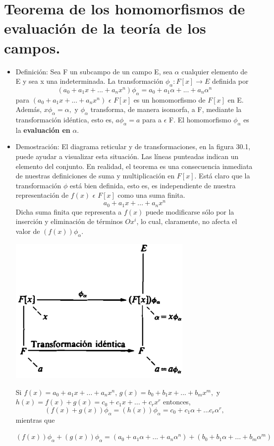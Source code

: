\documentclass[a4paper,12pt]{article}
\begin{document}
\tableofcontents

\section{Teorema de los homomorfismos de evaluación de la teoría de los campos.}


\begin{itemize}

    \item Definición:
     Sea F un subcampo de un campo E, sea $\alpha$ cualquier elemento de E y sea x una indeterminada. La transformación $\phi_\alpha:F[x]\longrightarrow E$ definida por \[ (a_0+a_1x+...+a_nx^n)\phi_\alpha =
     a_0+a_1\alpha+...+a_n\alpha^n     
\]
para $(a_0+a_1x+...+a_nx^n)$ $\epsilon$ $F[x]$ es un homomorfismo de $F[x]$ en E.
Además, $x\phi_\alpha = \alpha,$ y $\phi_\alpha$ transforma, de manera isomorfa, a F, mediante la 
transformación idéntica, esto es, $a\phi_\alpha = a $ para a $\epsilon$ F. El homomorfismo $\phi_\alpha$ es la \textbf{evaluación en }$\alpha.$
	\item Demostración:
	El diagrama reticular y de transformaciones, en la figura 30.1,
puede ayudar a visualizar esta situación. Las líneas punteadas indican un elemen­to del conjunto. En realidad, el teorema es una consecuencia inmediata de nuestras definiciones de suma y multiplicación en $F[x]$. Está claro que la trans­formación $\phi$ está bien definida, esto es, es independiente de nuestra representa­ción de $f(x)$ $\epsilon$ $F[x]$ como una suma finita.
\[ a_0+a_1x+...+a_nx^n\]
Dicha suma finita que representa a $f(x)$ puede modificarse sólo por la inserción y eliminación de términos $Ox^i$, lo cual, claramente, no afecta el valor de $(f(x))\phi_\alpha$.

\includegraphics[width=0.7\textwidth]{imagen_latex.png}\centering

Si $f(x) = a_0+a_1x+...+a_nx^n$, 
$g(x) = b_0+b_1x+...+b_mx^m,$ y $h(x) = f(x)+g(x)=c_0+c_1x+...+c_rx^r$ entonces,
\[(f(x)+g(x))\phi_\alpha=(h(x))\phi_\alpha = c_0+c_1\alpha+...c_r\alpha^r,\]
mientras que

$(f(x))\phi_\alpha+(g(x))\phi_\alpha = (a_0+a_1\alpha+...+a_n\alpha^n)+(b_0+b_1\alpha+...+b_m\alpha^m)$
\end{itemize}
\end{document}
